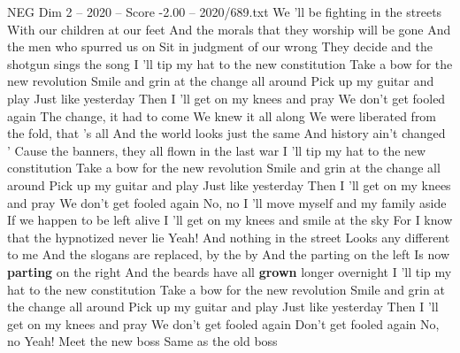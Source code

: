 \begin{textsample}{NEG Dim 2 – 2020 – Score -2.00 – 2020/689.txt}  \label{ex:f2_neg_026}
We 'll be fighting in the streets With our children at our feet And the morals that they worship will be gone And the men who spurred us on Sit in judgment of our wrong They decide and the shotgun sings the song I 'll tip my hat to the new constitution Take a bow for the new revolution Smile and grin at the change all around Pick up my guitar and play Just like yesterday Then I 'll get on my knees and pray We don't get fooled again The change, it had to come We knew it all along We were liberated from the fold, that 's all And the world looks just the same And history ain't changed ' Cause the banners, they all flown in the last war I 'll tip my hat to the new constitution Take a bow for the new revolution Smile and grin at the change all around Pick up my guitar and play Just like yesterday Then I 'll get on my knees and pray We don't get fooled again No, no I 'll move myself and my family aside If we happen to be left alive I 'll get on my knees and smile at the sky For I know that the hypnotized never lie Yeah!
And nothing in the street Looks any different to me And the slogans are replaced, by the by And the parting on the left Is now \textbf{parting} on the right And the beards have all \textbf{grown} longer overnight I 'll tip my hat to the new constitution Take a bow for the new revolution Smile and grin at the change all around Pick up my guitar and play Just like yesterday Then I 'll get on my knees and pray We don't get fooled again Don't get fooled again No, no Yeah!
Meet the new boss Same as the old boss

\end{textsample}

